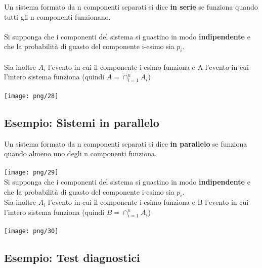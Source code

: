 \documentclass[12pt, letterpaper]{article}
\begin{document}
Un sistema formato da n componenti separati si dice \textbf{in serie} se funziona 
quando tutti gli n componenti funzionano.
\\
\\
Si supponga che i componenti del sistema si guastino in modo \textbf{indipendente}
e che la probabilità di guasto del componente i-esimo sia $p_i$.
\\
\\Sia inoltre $A_i$ l'evento in cui il componente i-esimo funziona e A l'evento 
in cui l'intero sistema funziona (quindi $A = \cap_{i=1}^n A_i$)
\\\\
\texttt{[image: png/28]}

\newpage

\subsection{Esempio: Sistemi in parallelo}

Un sistema formato da n componenti separati si dice \textbf{in parallelo} se 
funziona quando almeno uno degli n componenti funziona. 
\\\\
\texttt{[image: png/29]}
\\
Si supponga che i componenti del sistema si guastino in modo \textbf{indipendente} e che la probabilità di 
guasto del componente i-esimo sia $p_i$.
\\
Sia inoltre $A_i$ l'evento in cui il componente i-esimo funziona e B l'evento in cui l'intero sistema funziona (quindi $B = \cap_{i=1}^n A_i$)
\\\\
\texttt{[image: png/30]}

\subsection{Esempio: Test diagnostici}
\end{document}
